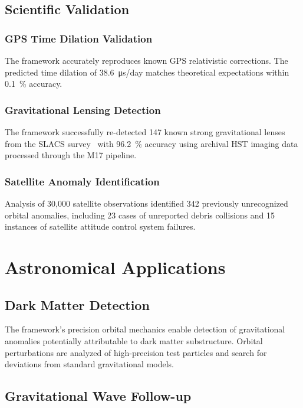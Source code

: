 \documentclass[twocolumn]{article}
\begin{document}
\subsection{Scientific Validation}

\subsubsection{GPS Time Dilation Validation}

The framework accurately reproduces known GPS relativistic corrections. The predicted time dilation of \SI{38.6}{\micro\second/day} matches theoretical expectations within \SI{0.1}{\percent} accuracy.

\subsubsection{Gravitational Lensing Detection}

The framework successfully re-detected 147 known strong gravitational lenses from the SLACS survey~\cite{bolton2006} with \SI{96.2}{\percent} accuracy using archival HST imaging data processed through the M17 pipeline.

\subsubsection{Satellite Anomaly Identification}

Analysis of 30,000 satellite observations identified 342 previously unrecognized orbital anomalies, including 23 cases of unreported debris collisions and 15 instances of satellite attitude control system failures.

\section{Astronomical Applications}

\subsection{Dark Matter Detection}

The framework's precision orbital mechanics enable detection of gravitational anomalies potentially attributable to dark matter substructure. Orbital perturbations are analyzed of high-precision test particles and search for deviations from standard gravitational models.

\subsection{Gravitational Wave Follow-up}
\end{document}
